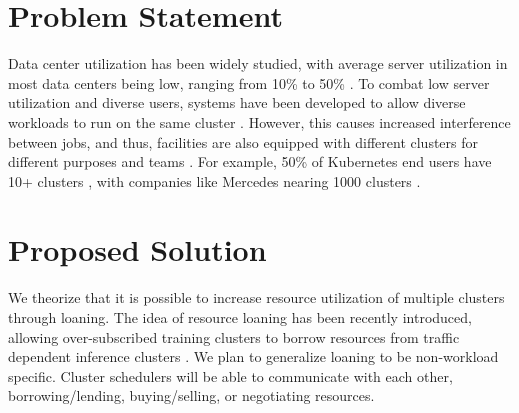 \section{Problem Statement}
Data center utilization has been widely studied, with average server utilization in most data centers being low, 
ranging from 10\% to 50\%
\cite{lo_heracles_2015}. 
To combat low server utilization and diverse users, systems have been developed to allow diverse workloads to run 
on the same cluster \cite{bhattacharya_hierarchical_2013, hindman_mesos_nodate}. 
However, this causes increased interference between jobs, and thus, 
facilities are also equipped with different clusters for different purposes and teams \cite{patel_what_2022, li_lyra_2023}. 
For example, 50\% of Kubernetes \cite{verma_large-scale_2015}
end users have 10+ clusters \cite{noauthor_cncf_2023} 
, with companies like Mercedes nearing 1000 clusters \cite{noauthor_mercedes-benz_2023}.

\section{Proposed Solution}
We theorize that it is possible to increase resource utilization of multiple clusters through loaning. 
The idea of resource loaning has been recently introduced, allowing over-subscribed training clusters to 
borrow resources from traffic dependent inference clusters \cite{li_lyra_2023}.
We plan to generalize loaning to be non-workload specific. Cluster schedulers will be able to communicate 
with each other, borrowing/lending, buying/selling, or negotiating resources.